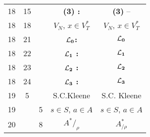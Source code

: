 \documentclass[a4paper,11pt]{article}
\begin{document}
\begin{center}
\begin{tabular}{|c|c|c|c|c|}
    18  & 15 & & \textbf{(3) :} & \textbf{(3)} -- \\
    18  & 18 & & $V_{ N }$,{ } $x \in V_{ T }^{ * }$
           & $V_{ N }$, $x \in V_{ T }^{ * }$ \\
    18  & 21 & & $\mathbf{\mathcal{L}_{ 0 }}$\textbf{:} & $\mathbf{\mathcal{L}_{ 0 }}$ \\
    18  & 22 & & $\mathbf{\mathcal{L}_{ 1 }}$ \textbf{:} & $\mathbf{\mathcal{L}_{ 1 }}$ \\
    18  & 23 & & $\mathbf{\mathcal{L}_{ 2 }}$ \textbf{:} & $\mathbf{\mathcal{L}_{ 2 }}$ \\
    18  & 24 & & $\mathbf{\mathcal{L}_{ 3 }}$ \textbf{:} & $\mathbf{\mathcal{L}_{ 3 }}$ \\
    19  &  5 & & S.C.Kleene & S.C. Kleene \\
    19  & &  5 & $s \in S$,{ } $a \in A$ & $s \in S$, $a \in A$ \\
    20  & &  8 & $A^{ * } /_{ \rho }$ & $A^{ * }_{ / \rho }$ \\
    \hline
  \end{tabular}





  \newpage


\end{center}
\end{document}

